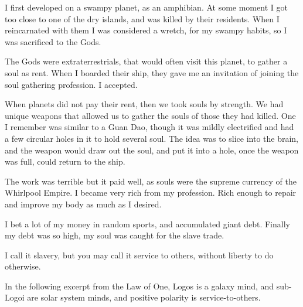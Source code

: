 \documentclass{report}
\begin{document}
I first developed on a swampy planet, as an amphibian. At some moment I got too
close to one of the dry islands, and was killed by their residents. When I
reincarnated with them I was considered a wretch, for my swampy habits, so I was
sacrificed to the Gods. 

The Gods were extraterrestrials, that would often visit this planet, to gather a
soul as rent. When I boarded their ship, they gave me an invitation of joining 
the soul gathering profession. I accepted. 

When planets did not pay their rent, then we took souls by strength. We had
unique weapons that allowed us to gather the souls of those they had killed. 
One I remember was similar to a Guan Dao, though it was mildly electrified and 
had a few circular holes in it to hold several soul. The idea was to slice into
the brain, and the weapon would draw out the soul, and put it into a hole,
once the weapon was full, could return to the ship. 

The work was terrible but it paid well, as souls were the supreme currency of 
the Whirlpool Empire. I became very rich from my profession. Rich enough to
repair and improve my body as much as I desired. 

I bet a lot of my money in random sports, and accumulated giant debt. 
Finally my debt was so high, my soul was caught for the slave trade. 

I call it slavery, but you may call it service to others, without liberty to do
otherwise. 

In the following excerpt from the Law of One, Logos is a galaxy mind, and
sub-Logoi are solar system minds, and positive polarity is service-to-others.
\end{document}
